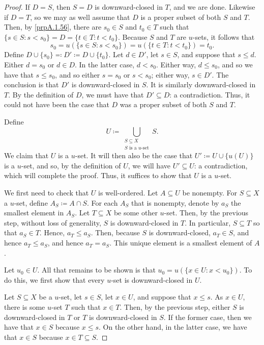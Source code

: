 \begin{thm}
\begin{proof}
If $D=S$, then $S=D$ is downward-closed in $T$, and we are done.  Likewise if $D=T$, so we may as well assume that $D$ is a proper subset of both $S$ and $T$.  Then, by \cref{prpA.1.56}, there are $s_0\in S$ and $t_0\in T$ such that $\{ s\in S:s<s_0\} =D=\{ t\in T:t<t_0\}$.  Because $S$ and $T$ are $u$-sets, it follows that
\begin{equation}
s_0=u\left( \{ s\in S:s<s_0\} \right) =u\left( \{ t\in T:t<t_0\} \right) =t_0.
\end{equation}
Define $D\cup \{ s_0\} \eqqcolon D'\coloneqq D\cup \{ t_0\}$.
Let $d\in D'$, let $s\in S$, and suppose that $s\leq d$.  Either $d=s_0$ or $d\in D$.  In the latter case, $d<s_0$.  Either way, $d\leq s_0$, and so we have that $s\leq s_0$, and so either $s=s_0$ or $s<s_0$; either way, $s\in D'$.  The conclusion is that $D'$ is downward-closed in $S$.  It is similarly downward-closed in $T$.  By the definition of $D$, we must have that $D'\subseteq D$:  a contradiction.  Thus, it could not have been the case that $D$ was a proper subset of both $S$ and $T$.

Define
\begin{equation}
U\coloneqq \bigcup _{\substack{S\subseteq X \\ S\text{ is a }u\text{-set}}}S.
\end{equation}
We claim that $U$ is a $u$-set.  It will then also be the case that $U'\coloneqq U\cup \{ u(U)\}$ is a $u$-set, and so, by the definition of $U$, we will have $U'\subseteq U$:  a contradiction, which will complete the proof.  Thus, it suffices to show that $U$ is a $u$-set.

We first need to check that $U$ is well-ordered.  Let $A\subseteq U$ be nonempty.  For $S\subseteq X$ a $u$-set, define $A_S\coloneqq A\cap S$.  For each $A_S$ that is nonempty, denote by $a_S$ the smallest element in $A_S$.  Let $T\subseteq X$ be some other $u$-set.  Then, by the previous step, without loss of generality, $S$ is downward-closed in $T$.  In particular, $S\subseteq T$ so that $a_S\in T$.  Hence, $a_T\leq a_S$.  Then, because $S$ is downward-closed, $a_T\in S$, and hence $a_T\leq a_S$, and hence $a_T=a_S$.  This unique element is a smallest element of $A$.

Let $u_0\in U$.  All that remains to be shown is that $u_0=u\left( \{ x\in U:x<u_0\} \right)$.  To do this, we first show  that every $u$-set is downward-closed in $U$.

Let $S\subseteq X$ be a $u$-set, let $s\in S$, let $x\in U$, and suppose that $x\leq s$.  As $x\in U$, there is some $u$-set $T$ such that $x\in T$.  Then, by the previous step, either $S$ is downward-closed in $T$ or $T$ is downward-closed in $S$.  If the former case, then we have that $x\in S$ because $x\leq s$.  On the other hand, in the latter case, we have that $x\in S$ because $x\in T\subseteq S$.


\end{proof}
\end{thm}
